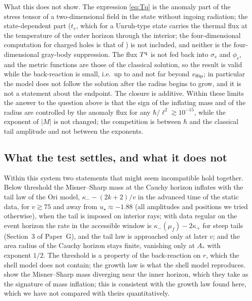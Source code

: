 \documentclass[11pt]{article}
\newcommand{\Gehdatan}{3}\newcommand{\Gkernelnum}{4}\newcommand{\Gshelln}{4.7}\newcommand{\Grayn}{5}
\begin{document}
What this does not show. The expression \eqref{eq:Tq} is the anomaly part of the stress tensor of a two-dimensional field in the state without ingoing radiation; the state-dependent part ($t_v$, which for a Unruh-type state carries the thermal flux at the temperature of the outer horizon through the interior; the four-dimensional computation for charged holes is that of \citet{Lanir2019}) is not included, and neither is the four-dimensional gray-body suppression. The flux $T^{\rm q}$ is not fed back into $\sigma_v$ and $\phi_v$, and the metric functions are those of the classical solution, so the result is valid while the back-reaction is small, i.e.\ up to and not far beyond $v_{\rm flip}$; in particular the model does not follow the solution after the radius begins to grow, and it is not a statement about the endpoint. The closure is additive. Within these limits the answer to the question above is that the sign of the inflating mass and of the radius are controlled by the anomaly flux for any $\hbar/\ell^2\gtrsim10^{-15}$, while the exponent of $|M|$ is not changed; the competition is between $\hbar$ and the classical tail amplitude and not between the exponents.

\subsection{What the test settles, and what it does not}
\label{sec:settles}

Within this system two statements that might seem incompatible hold together. Below threshold the Misner--Sharp mass at the Cauchy horizon inflates with the tail law of the Ori model, $\kappa_--(2k+2)/v$ in the advanced time of the static data, for $v\gtrsim75$ and away from $u_\star\approx-1.88$ (all amplitudes and positions we tried otherwise), when the tail is imposed on interior rays; with data regular on the event horizon the rate in the accessible window is $\kappa_-(\mu_f)-2\kappa_+$ for steep tails (Section~\Gehdatan{} of Paper~G), and the tail law is approached only at later $v$; and the area radius of the Cauchy horizon stays finite, vanishing only at $A_*$ with exponent $1/2$. The threshold is a property of the back-reaction on $r$, which the shell model does not contain; the growth law is what the shell model reproduces. \citet{ShaoEtAl2025} show the Misner--Sharp mass diverging near the inner horizon, which they take as the signature of mass inflation; this is consistent with the growth law found here, which we have not compared with theirs quantitatively.
\end{document}
